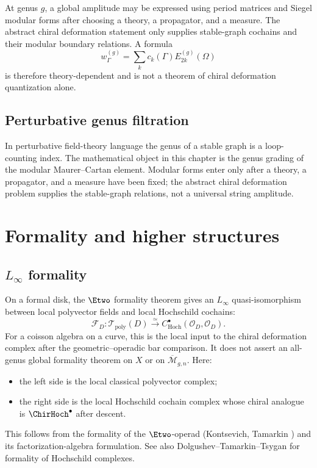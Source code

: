 At genus $g$, a global amplitude may be expressed using period
matrices and Siegel modular forms after choosing a theory, a
propagator, and a measure. The abstract chiral deformation statement
only supplies stable-graph cochains and their modular boundary
relations. A formula
\[
w_\Gamma^{(g)}=\sum_k c_k(\Gamma)E_{2k}^{(g)}(\Omega)
\]
is therefore theory-dependent and is not a theorem of chiral
deformation quantization alone.

\subsection{Perturbative genus filtration}

In perturbative field-theory language the genus of a stable graph is a
loop-counting index. The mathematical object in this chapter is the
genus grading of the modular Maurer--Cartan element. Modular forms
enter only after a theory, a propagator, and a measure have been fixed;
the abstract chiral deformation problem supplies the stable-graph
relations, not a universal string amplitude.

\section{Formality and higher structures}

\subsection{\texorpdfstring{$L_\infty$ formality}{L- formality}}

\begin{theorem}\label{thm:chiral-formality}
On a formal disk, the $\Etwo$ formality theorem gives an
$L_\infty$ quasi-isomorphism between local polyvector fields and local
Hochschild cochains:
\[
\mathcal{F}_{D}\colon
\mathcal{T}_{\mathrm{poly}}(D)
\xrightarrow{\simeq}
C^\bullet_{\mathrm{Hoch}}(\mathcal O_D,\mathcal O_D).
\]
For a coisson algebra on a curve, this is the local input to the
chiral deformation complex after the geometric--operadic bar
comparison. It does not assert an all-genus global formality theorem on
\(X\) or on \(\overline{\mathcal M}_{g,n}\).
Here:
\begin{itemize}
\item the left side is the local classical polyvector complex;
\item the right side is the local Hochschild cochain complex whose
 chiral analogue is $\ChirHoch^\bullet$ after descent.
\end{itemize}
This follows from the formality of the $\Etwo$-operad
(Kontsevich, Tamarkin \cite{Tamarkin00}) and its factorization-algebra
formulation. See also Dolgushev--Tamarkin--Tsygan \cite{DTT09} for
formality of Hochschild complexes.
\end{theorem}


